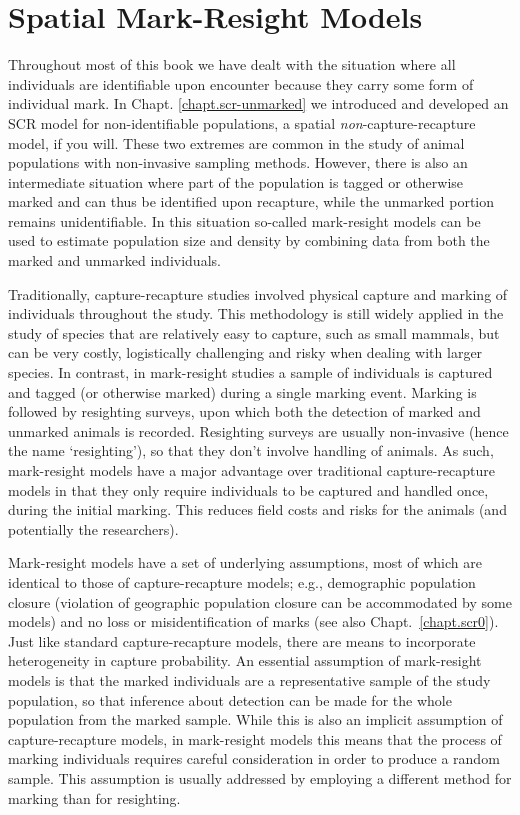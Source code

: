\chapter{
Spatial Mark-Resight Models
}

\label{chapt.partialID}

\vspace{.3in}


Throughout most of this book we have dealt with the situation where
all individuals are identifiable upon encounter because they
carry some form of individual mark. In Chapt. \ref{chapt.scr-unmarked}
we introduced and developed an SCR model for non-identifiable
populations, a spatial {\it non}-capture-recapture model, if you will.
These two extremes are common in the study of animal populations with
non-invasive sampling methods. However, there is also an intermediate
situation where part of the population is tagged or otherwise marked
and can thus be identified upon recapture, while the unmarked portion
remains unidentifiable.  In this situation so-called mark-resight
models \citep{bartmann_etal:1987, arnason_etal:1991, neal_etal:1993}
can be used to estimate population size and density by combining data
from both the marked and unmarked individuals.

Traditionally, capture-recapture studies involved physical capture and
marking of individuals throughout the study.  This methodology is
still widely applied in the study of species that are relatively easy
to capture, such as small mammals, but can be very costly,
logistically challenging and risky when dealing with larger
species. In contrast, in mark-resight studies a sample of individuals
is captured and tagged (or otherwise marked) during a single marking
event. Marking is followed by resighting surveys, upon which both the
detection of marked
and unmarked animals
is recorded. Resighting surveys are usually non-invasive (hence the
name `resighting'), so that they don't involve handling of animals. As
such, mark-resight models have a major advantage over traditional
capture-recapture models in that they only require individuals to be
captured and handled once, during the initial marking. This reduces
field costs and risks for the animals (and potentially the
researchers).

Mark-resight models have a set of underlying assumptions, most of
which are identical to those of capture-recapture models; e.g.,
demographic population closure (violation of geographic population
closure can be accommodated by some models) and no loss or
misidentification of marks (see also Chapt.~\ref{chapt.scr0}).  Just
like standard capture-recapture models, there are means to incorporate
heterogeneity in capture probability. An essential assumption of
mark-resight models is that the marked individuals are a
representative sample of the study population, so that inference about
detection can be made for the whole population from the marked
sample. While this is also an implicit assumption of capture-recapture
models, in mark-resight models this means that the process of marking
individuals requires careful consideration in order to produce a
random sample.  This assumption is usually addressed by employing a
different method for marking than for resighting.


